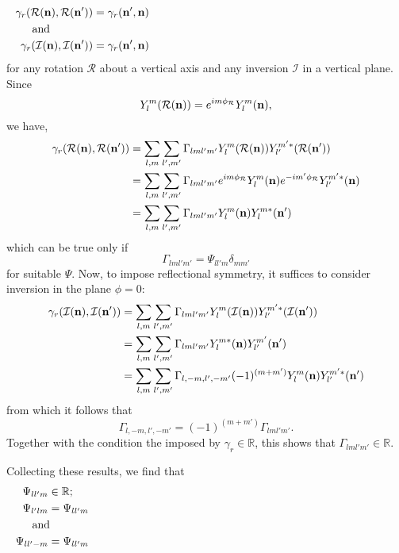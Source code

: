 \begin{align}
\gamma_r(\mathcal{R}(\bn),\mathcal{R}(\bnp)) &= \gamma_r(\bnp,\bn) \\
\noalign{and}
\gamma_r(\mathcal{I}(\bn),\mathcal{I}(\bnp)) &= \gamma_r(\bnp,\bn) \\
\end{align}
for any rotation $\mathcal{R}$ about a vertical axis and any inversion 
$\mathcal{I}$ in a vertical plane. Since
\begin{equation}
Y_l^m(\mathcal{R}(\mathbf{n}))=e^{im\phi_{\mathcal{R}}} Y_l^m(\mathbf{n}),
\end{equation}
we have,
\begin{equation}
\begin{split}
\gamma_r(\mathcal{R}(\mathbf{n}),\mathcal{R}(\mathbf{n}')) &= \sum_{l,m} \sum_{l',m'} 
\Gamma_{lml'm'} Y_l^m(\mathcal{R}(\mathbf{n})) Y_{l'}^{m'*} (\mathcal{R}(\mathbf{n}')) \\
&=\sum_{l,m} \sum_{l',m'} \Gamma_{lml'm'} e^{im\phi_{\mathcal{R}}} 
Y_l^m(\mathbf{n}) e^{-im'\phi_{\mathcal{R}}} Y_{l'}^{m'*} (\mathbf{n}) \\
&=\sum_{l,m} \sum_{l',m'} \Gamma_{lml'm'} Y_{l}^{m}(\mathbf{n}) Y_l^{m*} (\mathbf{n}') 
\end{split}
\end{equation}
which can be true only if
\begin{equation}
\Gamma_{lml'm'}=\Psi_{ll'm}\delta_{mm'}
\end{equation}
for suitable $\Psi$. Now, to impose reflectional symmetry, it suffices to
consider inversion in the plane $\phi=0$:
\begin{equation}
\begin{split}
\gamma_r(\mathcal{I}(\mathbf{n}),\mathcal{I}(\mathbf{n}')) &= \sum_{l,m} \sum_{l',m'}
\Gamma_{lml'm'} Y_l^m(\mathcal{I}(\mathbf{n})) Y_{l'}^{m'*} (\mathcal{I}(\mathbf{n}')) \\
&=\sum_{l,m} \sum_{l',m'} \Gamma_{lml'm'} Y_l^{m*}(\mathbf{n}) Y_{l'}^{m'} (\mathbf{n}') \\
&=\sum_{l,m} \sum_{l',m'} \Gamma_{l,-m,l',-m'} (-1)^{(m+m')} 
Y_{l}^{m}(\mathbf{n}) Y_{l'}^{m'*} (\mathbf{n}')
\end{split}
\end{equation}
from which it follows that
\begin{equation}
\Gamma_{l,-m,l',-m'}=(-1)^{(m+m')} \Gamma_{lml'm'}.
\end{equation}
Together with the condition the imposed by $\gamma_r \in \mathbb{R}$, this
shows that $\Gamma_{lml'm'}\in \mathbb{R}$.

Collecting these results, we find that
\begin{align}
\Psi_{ll'm} &\in \mathbb{R}; \\
\Psi_{l'lm} &= \Psi_{ll'm} \\
\noalign{and}
\Psi_{ll'-m} &= \Psi_{ll'm} 
\end{align}


